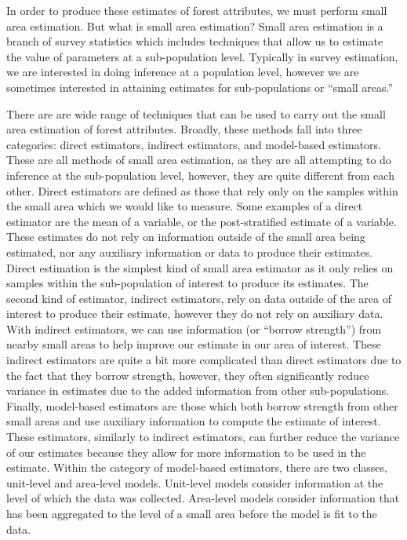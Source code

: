 \documentclass[12pt,twoside]{reedthesis}
\begin{document}
In order to produce these estimates of forest attributes, we must perform small area estimation. But what is small area estimation? Small area estimation is a branch of survey statistics which includes techniques that allow us to estimate the value of parameters at a sub-population level. Typically in survey estimation, we are interested in doing inference at a population level, however we are sometimes interested in attaining estimates for sub-populations or ``small areas.''

There are are wide range of techniques that can be used to carry out the small area estimation of forest attributes. Broadly, these methods fall into three categories: direct estimators, indirect estimators, and model-based estimators. These are all methods of small area estimation, as they are all attempting to do inference at the sub-population level, however, they are quite different from each other. Direct estimators are defined as those that rely only on the samples within the small area which we would like to measure. Some examples of a direct estimator are the mean of a variable, or the post-stratified estimate of a variable. These estimates do not rely on information outside of the small area being estimated, nor any auxiliary information or data to produce their estimates. Direct estimation is the simplest kind of small area estimator as it only relies on samples within the sub-population of interest to produce its estimates. The second kind of estimator, indirect estimators, rely on data outside of the area of interest to produce their estimate, however they do not rely on auxiliary data. With indirect estimators, we can use information (or ``borrow strength'') from nearby small areas to help improve our estimate in our area of interest. These indirect estimators are quite a bit more complicated than direct estimators due to the fact that they borrow strength, however, they often significantly reduce variance in estimates due to the added information from other sub-populations. Finally, model-based estimators are those which both borrow strength from other small areas and use auxiliary information to compute the estimate of interest. These estimators, similarly to indirect estimators, can further reduce the variance of our estimates because they allow for more information to be used in the estimate. Within the category of model-based estimators, there are two classes, unit-level and area-level models. Unit-level models consider information at the level of which the data was collected. Area-level models consider information that has been aggregated to the level of a small area before the model is fit to the data.
\end{document}
